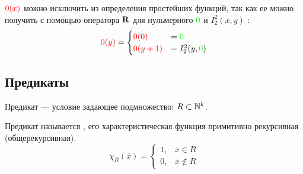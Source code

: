 \begin{note}
	$ {\color{red}0(x)}$ можно исключить из определения простейших функций, так как ее можно получить с помощью оператора $ \mathbf{R}$ для нульмерного $ {\color{green}0}$ и $ I^{2}_{2} (x, y)$ :
	\[
		{\color{red}0(y)} = 
		\begin{cases}
			{\color{red}0(0)} &= {\color{green}0} \\
			{\color{red}0(y+1)} &=I^{2}_{2} (y, {\color{green}0})
		\end{cases}
	\] 
\end{note}


\subsection{Предикаты}
\begin{defn}
	Предикат --- условие задающее подмножество: $ R \subset \mathbb{N}^{k}$.
	
	\noindent
	Предикат называется , его характеристическая функция примитивно рекурсивная (общерекурсивная).
\[
	\chi_{R}(\overline{x})= 
	\begin{cases}
		1, &\overline{x} \in  R \\
		0, &\overline{x} \notin R
	\end{cases}
\] 
\end{defn}


